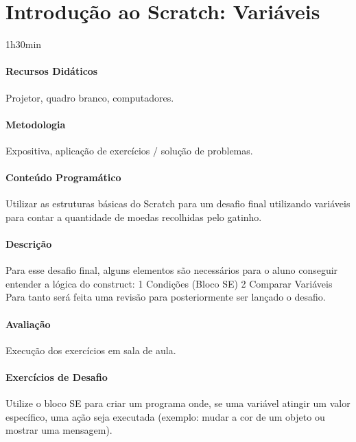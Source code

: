 \documentclass[letterpaper,10pt,brazil]{sphinxmanual}
\begin{document}
\sphinxstepscope


\chapter{Introdução ao Scratch: Variáveis}
\label{\detokenize{modelo_aula_05:introducao-ao-scratch-variaveis}}\label{\detokenize{modelo_aula_05::doc}}
\sphinxAtStartPar
{} 1h30min
\subsubsection*{Recursos Didáticos}

\sphinxAtStartPar
Projetor, quadro branco, computadores.
\subsubsection*{Metodologia}

\sphinxAtStartPar
Expositiva, aplicação de exercícios / solução de problemas.
\subsubsection*{Conteúdo Programático}

\sphinxAtStartPar
Utilizar as estruturas básicas do Scratch para um desafio final utilizando variáveis
para contar a quantidade de moedas recolhidas pelo gatinho.
\subsubsection*{Descrição}

\sphinxAtStartPar
Para esse desafio final, alguns elementos são necessários para o aluno conseguir entender
a lógica do construct:
1 \sphinxhyphen{} Condições (Bloco SE)
2 \sphinxhyphen{} Comparar Variáveis
Para tanto será feita uma revisão para posteriormente ser lançado o desafio.
\subsubsection*{Avaliação}

\sphinxAtStartPar
Execução dos exercícios em sala de aula.
\subsubsection*{Exercícios de Desafio}

\sphinxAtStartPar
{}
Utilize o bloco SE para criar um programa onde, se uma variável atingir um valor específico,
uma ação seja executada (exemplo: mudar a cor de um objeto ou mostrar uma mensagem).
\end{document}
